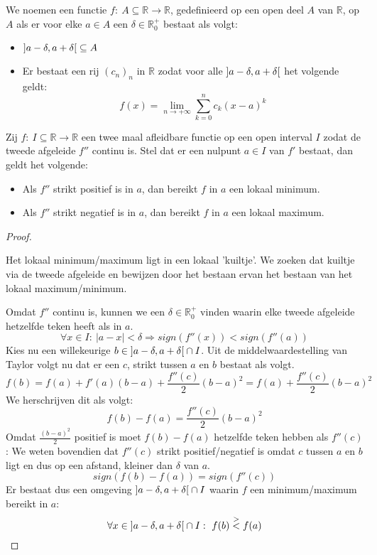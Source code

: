 \documentclass[main.tex]{subfiles}
\begin{document}
\begin{de}
  We noemen een functie $f:\ A \subseteq \mathbb{R} \rightarrow \mathbb{R}$, gedefinieerd op een open deel $A$ van $\mathbb{R}$,  op $A$ als er voor elke $a\in A$ een $\delta \in \mathbb{R}_{0}^{+}$ bestaat als volgt:
  \begin{itemize}
  \item $\interval[open]{a-\delta}{a+\delta} \subseteq A$
  \item Er bestaat een rij $(c_{n})_{n}$ in $\mathbb{R}$ zodat voor alle $\interval[open]{a-\delta}{a+\delta}$ het volgende geldt:
    \[ f(x) = \lim_{n\rightarrow +\infty}\sum_{k=0}^{n}c_{k}(x-a)^{k} \]  
  \end{itemize}
\end{de}

\begin{bpr}
  Zij $f:\ I \subseteq \mathbb{R} \rightarrow \mathbb{R}$ een twee maal afleidbare functie op een open interval $I$ zodat de tweede afgeleide $f''$ continu is.
  Stel dat er een nulpunt $a\in I$ van $f'$ bestaat, dan geldt het volgende:
  \begin{itemize}
  \item Als $f''$ strikt positief is in $a$, dan bereikt $f$ in $a$ een lokaal minimum.
  \item Als $f''$ strikt negatief is in $a$, dan bereikt $f$ in $a$ een lokaal maximum.
  \end{itemize}

  \begin{proof}
    \begin{idee}
      Het lokaal minimum/maximum ligt in een lokaal 'kuiltje'.
      We zoeken dat kuiltje via de tweede afgeleide en bewijzen door het bestaan ervan het bestaan van het lokaal maximum/minimum.
    \end{idee}
    
    Omdat $f''$ continu is, kunnen we een $\delta \in \mathbb{R}_{0}^{+}$ vinden waarin elke tweede afgeleide hetzelfde teken heeft als in $a$.
    \[ \forall x\in I:\ |a-x|< \delta \Rightarrow sign(f''(x)) < sign(f''(a)) \]
    Kies nu een willekeurige $b\in \interval[open]{a-\delta}{a+\delta} \cap I$.
    Uit de middelwaardestelling van Taylor volgt nu dat er een $c$, strikt tussen $a$ en $b$ bestaat als volgt.
    \[ f(b) = f(a) + f'(a)(b-a) + \frac{f''(c)}{2}(b-a)^{2} = f(a) + \frac{f''(c)}{2}(b-a)^{2} \]
    We herschrijven dit als volgt:
    \[ f(b)-f(a) =\frac{f''(c)}{2}(b-a)^{2} \]
    Omdat $\frac{(b-a)^{2}}{2}$ positief is moet $f(b)-f(a)$ hetzelfde teken hebben als $f''(c)$:
    We weten bovendien dat $f''(c)$ strikt positief/negatief is omdat $c$ tussen $a$ en $b$ ligt en dus op een afstand, kleiner dan $\delta$ van $a$.
    \[ sign(f(b)-f(a)) = sign(f''(c)) \]
    Er bestaat dus een omgeving $\interval[open]{a-\delta}{a+\delta} \cap I$ waarin $f$ een minimum/maximum bereikt in $a$:
    \[ \forall x \in \interval[open]{a-\delta}{a+\delta} \cap I:\ f(b) \overset{>}{<} f(a) \]

  \end{proof}
\end{bpr}
\end{document}
